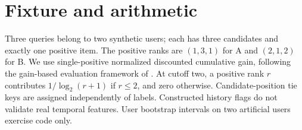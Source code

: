 \section{Fixture and arithmetic}
Three queries belong to two synthetic users; each has three candidates and
exactly one positive item. The positive ranks are $(1,3,1)$ for A and $(2,1,2)$
for B. We use single-positive normalized discounted cumulative gain, following
the gain-based evaluation framework of \cite{jarvelin2002cumulated}.
At cutoff two, a positive rank $r$ contributes $1/\log_2(r+1)$ if $r\leq 2$,
and zero otherwise. Candidate-position tie keys are assigned independently of
labels. Constructed history flags do not validate real temporal features.
User bootstrap intervals on two artificial users exercise code only.
